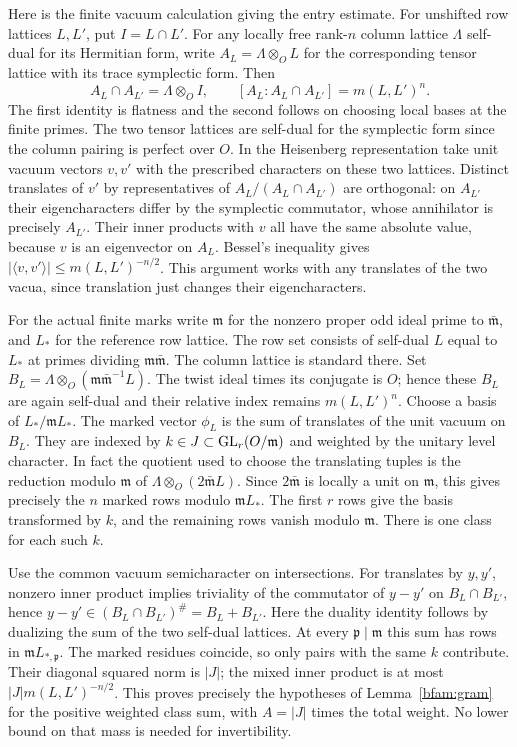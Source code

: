 Here is the finite vacuum calculation giving the entry estimate.
For unshifted row lattices \(L,L'\), put
\(I=L\cap L'\). For any locally free rank-\(n\) column lattice
\(\Lambda\) self-dual for its Hermitian form, write
\(A_L=\Lambda\otimes_O L\) for the corresponding tensor lattice
with its trace symplectic form. Then
\[
 A_L\cap A_{L'}=\Lambda\otimes_O I,\qquad
 [A_L:A_L\cap A_{L'}]=m(L,L')^n .
\]
The first identity is flatness and the second follows on choosing
local bases at the finite primes. The two tensor lattices are
self-dual for the symplectic form since the column pairing
is perfect over \(O\). In the Heisenberg representation take
unit vacuum vectors \(v,v'\) with the prescribed characters on
these two lattices. Distinct translates of \(v'\) by representatives
of \(A_L/(A_L\cap A_{L'})\) are orthogonal: on \(A_{L'}\) their
eigencharacters differ by the symplectic commutator, whose
annihilator is precisely \(A_{L'}\). Their inner products with
\(v\) all have the same absolute value, because \(v\) is an
eigenvector on \(A_L\). Bessel's inequality gives
\(|\langle v,v'\rangle|\le m(L,L')^{-n/2}\).
This argument works with any translates of the two vacua, since
translation just changes their eigencharacters.

For the actual finite marks write \(\mathfrak m\) for the nonzero
proper odd ideal prime to \(\bar{\mathfrak m}\), and \(L_*\) for
the reference row lattice. The row set consists of self-dual \(L\)
equal to \(L_*\) at primes dividing \(\mathfrak m\bar{\mathfrak m}\).
The column lattice is standard there. Set
\(B_L=\Lambda\otimes_O(\mathfrak m\bar{\mathfrak m}^{-1}L)\).
The twist ideal times its conjugate is \(O\); hence these \(B_L\)
are again self-dual and their relative index remains \(m(L,L')^n\).
Choose a basis of \(L_*/\mathfrak m L_*\). The marked vector
\(\phi_L\) is the sum of translates of the unit vacuum on \(B_L\).
They are indexed by \(k\in J\subset{\rm GL}_r(O/\mathfrak m)\)
and weighted by the unitary level character. In fact the quotient
used to choose the translating tuples is the reduction modulo
\(\mathfrak m\) of \(\Lambda\otimes_O(2\bar{\mathfrak m}L)\).
Since \(2\bar{\mathfrak m}\) is locally a unit on \(\mathfrak m\),
this gives precisely the \(n\) marked rows modulo \(\mathfrak m L_*\).
The first \(r\) rows give the basis transformed by \(k\), and
the remaining rows vanish modulo \(\mathfrak m\). There is one
class for each such \(k\).

Use the common vacuum semicharacter on intersections. For
translates by \(y,y'\), nonzero inner product implies triviality
of the commutator of \(y-y'\) on \(B_L\cap B_{L'}\), hence
\(y-y'\in (B_L\cap B_{L'})^\#=B_L+B_{L'}\).
Here the duality identity follows by dualizing the sum of the
two self-dual lattices. At every \(\mathfrak p\mid\mathfrak m\)
this sum has rows in \(\mathfrak m L_{*,\mathfrak p}\).
The marked residues coincide, so only pairs with the same \(k\)
contribute. Their diagonal squared norm is \(|J|\); the mixed
inner product is at most \(|J|m(L,L')^{-n/2}\).
This proves precisely the hypotheses of Lemma~\ref{bfam:gram}
for the positive weighted class sum, with \(A=|J|\) times the
total weight. No lower bound on that mass is needed for invertibility.

